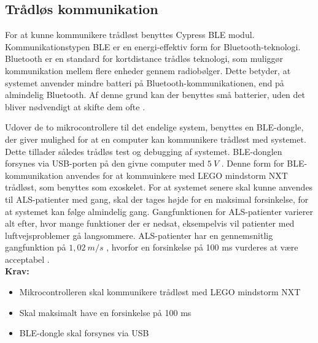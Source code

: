 \subsection{Trådløs kommunikation}
For at kunne kommunikere trådløst benyttes Cypress BLE modul. Kommunikationstypen BLE \citep{cypressguide2014} er en energi-effektiv form for Bluetooth-teknologi. Bluetooth er en standard for kortdistance trådløs teknologi, som muliggør kommunikation mellem flere enheder gennem radiobølger. Dette betyder, at systemet anvender mindre batteri på Bluetooth-kommunikationen, end på almindelig Bluetooth. Af denne grund kan der benyttes små batterier, uden det bliver nødvendigt at skifte dem ofte \citep{gupta2013}. 
\\
\noindent

Udover de to mikrocontrollere til det endelige system, benyttes en BLE-dongle, der giver mulighed for at en computer kan kommunikere trådløst med systemet. Dette tillader således trådløs test og debugging af systemet. BLE-donglen forsynes via USB-porten på den givne computer med $5~V$ \citep{cypressguide2014}. Denne form for BLE-kommunikation anvendes for at kommuinkere med LEGO mindstorm NXT trådløst, som benyttes som exoskelet. For at systemet senere skal kunne anvendes til ALS-patienter med gang, skal der tages højde for en maksimal forsinkelse, for at systemet kan følge almindelig gang. Gangfunktionen for ALS-patienter varierer alt efter, hvor mange funktioner der er nedsat, eksempelvis vil patienter med luftvejsproblemer gå langsommere. ALS-patienter har en gennemsnitlig gangfunktion på $1,02~m/s$ \citep{Hausdorff2000}, hvorfor en forsinkelse på 100 ms vurderes at være acceptabel . 
\\

\textbf{Krav:}
\begin{itemize}
\item Mikrocontrolleren skal kommunikere trådløst med LEGO mindstorm NXT
\item Skal maksimalt have en forsinkelse på 100 ms 
\item BLE-dongle skal forsynes via USB
\end{itemize}
